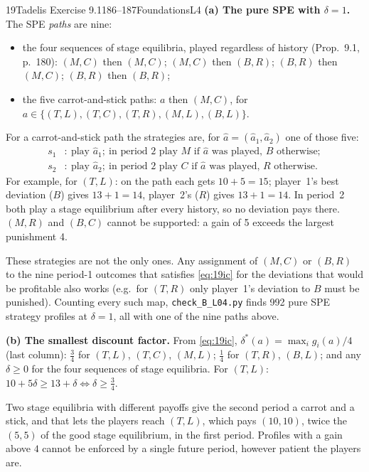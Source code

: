 \begin{exsol}{19}{Tadelis Exercise 9.1}{186--187}{Foundations}{L4}
\textbf{(a) The pure SPE with $\delta = 1$.} The SPE \emph{paths} are nine:
\begin{itemize}
  \item the four sequences of stage equilibria, played regardless of history (Prop.~9.1, p.~180):
  $(M,C)$ then $(M,C)$; $(M,C)$ then $(B,R)$; $(B,R)$ then $(M,C)$; $(B,R)$ then $(B,R)$;
  \item the five carrot-and-stick paths: $a$ then $(M,C)$, for $a \in \{(T,L), (T,C), (T,R),
  (M,L), (B,L)\}$.
\end{itemize}
For a carrot-and-stick path the strategies are, for $\hat a = (\hat a_1, \hat a_2)$ one of those five:
\begin{align*}
  s_1&:\ \text{play } \hat a_1;\ \text{in period 2 play } M \text{ if } \hat a \text{ was played, } B
  \text{ otherwise};\\
  s_2&:\ \text{play } \hat a_2;\ \text{in period 2 play } C \text{ if } \hat a \text{ was played, } R
  \text{ otherwise}.
\end{align*}
For example, for $(T,L)$: on the path each gets $10 + 5 = 15$; player~1's best deviation ($B$) gives
$13 + 1 = 14$, player~2's ($R$) gives $13 + 1 = 14$. In period~2 both play a stage equilibrium after
every history, so no deviation pays there. $(M,R)$ and $(B,C)$ cannot be supported: a gain of 5
exceeds the largest punishment 4.

These strategies are not the only ones. Any assignment of $(M,C)$ or $(B,R)$ to the nine period-1 outcomes
that satisfies \eqref{eq:19ic} for the deviations that would be profitable also works (e.g.\ for
$(T,R)$ only player~1's deviation to $B$ must be punished). Counting every such map,
\texttt{check\_B\_L04.py} finds 992 pure SPE strategy profiles at $\delta = 1$, all with one of the
nine paths above.

\textbf{(b) The smallest discount factor.} From \eqref{eq:19ic},
$\delta^*(a) = \max_i g_i(a)/4$ (last column): $\frac34$ for $(T,L)$, $(T,C)$, $(M,L)$;
$\frac14$ for $(T,R)$, $(B,L)$; and any $\delta \ge 0$ for the four sequences of stage equilibria.
For $(T,L)$: $10 + 5\delta \ge 13 + \delta \iff \delta \ge \frac34$.

\interp Two stage equilibria with different payoffs give the second period a carrot and a stick,
and that lets the players reach $(T,L)$, which pays $(10,10)$, twice the $(5,5)$ of the good stage
equilibrium, in the first period. Profiles with a gain above $4$ cannot be enforced by a single
future period, however patient the players are.


\end{exsol}
